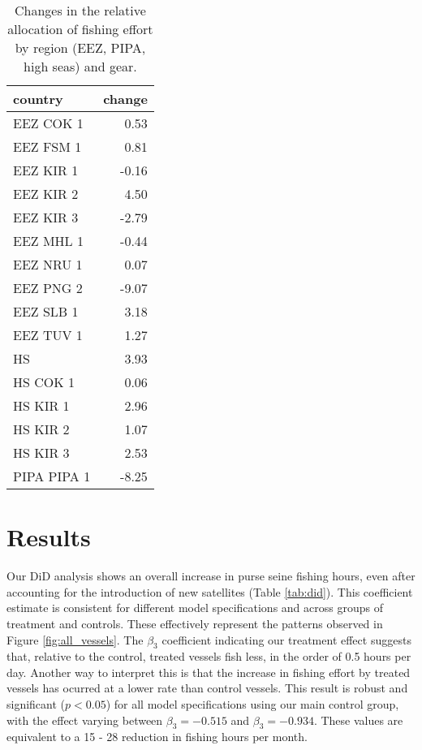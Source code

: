 \documentclass[11pt,]{article}
\begin{document}
\begin{table}[H]

\caption{\label{tab:unnamed-chunk-10}\label{tab:ba_disp}Changes in the relative allocation of fishing effort by region (EEZ, PIPA, high seas) and gear.}
\centering
\begin{tabular}[t]{lr}
\toprule
country & change\\
\midrule
EEZ COK 1 & 0.53\\
EEZ FSM 1 & 0.81\\
EEZ KIR 1 & -0.16\\
EEZ KIR 2 & 4.50\\
EEZ KIR 3 & -2.79\\
\addlinespace
EEZ MHL 1 & -0.44\\
EEZ NRU 1 & 0.07\\
EEZ PNG 2 & -9.07\\
EEZ SLB 1 & 3.18\\
EEZ TUV 1 & 1.27\\
\addlinespace
HS & 3.93\\
HS COK 1 & 0.06\\
HS KIR 1 & 2.96\\
HS KIR 2 & 1.07\\
HS KIR 3 & 2.53\\
PIPA PIPA 1 & -8.25\\
\bottomrule
\end{tabular}
\end{table}

\clearpage

\hypertarget{results}{%
\section{Results}\label{results}}

Our DiD analysis shows an overall increase in purse seine fishing hours,
even after accounting for the introduction of new satellites (Table
\ref{tab:did}). This coefficient estimate is consistent for different
model specifications and across groups of treatment and controls. These
effectively represent the patterns observed in Figure
\ref{fig:all_vessels}. The \(\beta_3\) coefficient indicating our
treatment effect suggests that, relative to the control, treated vessels
fish less, in the order of 0.5 hours per day. Another way to interpret
this is that the increase in fishing effort by treated vessels has
ocurred at a lower rate than control vessels. This result is robust and
significant (\(p < 0.05\)) for all model specifications using our main
control group, with the effect varying between \(\beta_3 = -0.515\) and
\(\beta_3 = -0.934\). These values are equivalent to a 15 - 28 reduction
in fishing hours per month.
\end{document}

